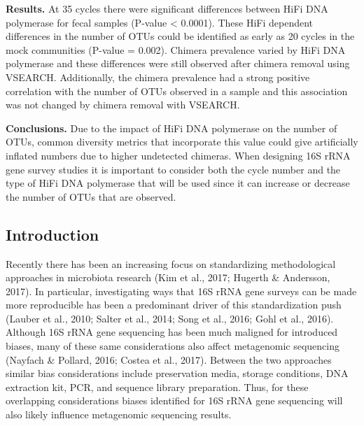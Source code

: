 \documentclass[12pt,]{article}
\begin{document}
\textbf{Results.} At 35 cycles there were significant differences
between HiFi DNA polymerase for fecal samples (P-value \textless{}
0.0001). These HiFi dependent differences in the number of OTUs could be
identified as early as 20 cycles in the mock communities (P-value =
0.002). Chimera prevalence varied by HiFi DNA polymerase and these
differences were still observed after chimera removal using VSEARCH.
Additionally, the chimera prevalence had a strong positive correlation
with the number of OTUs observed in a sample and this association was
not changed by chimera removal with VSEARCH.

\textbf{Conclusions.} Due to the impact of HiFi DNA polymerase on the
number of OTUs, common diversity metrics that incorporate this value
could give artificially inflated numbers due to higher undetected
chimeras. When designing 16S rRNA gene survey studies it is important to
consider both the cycle number and the type of HiFi DNA polymerase that
will be used since it can increase or decrease the number of OTUs that
are observed.

\newpage

\subsection{Introduction}\label{introduction}

Recently there has been an increasing focus on standardizing
methodological approaches in microbiota research (Kim et al., 2017;
Hugerth \& Andersson, 2017). In particular, investigating ways that 16S
rRNA gene surveys can be made more reproducible has been a predominant
driver of this standardization push (Lauber et al., 2010; Salter et al.,
2014; Song et al., 2016; Gohl et al., 2016). Although 16S rRNA gene
sequencing has been much maligned for introduced biases, many of these
same considerations also affect metagenomic sequencing (Nayfach \&
Pollard, 2016; Costea et al., 2017). Between the two approaches similar
bias considerations include preservation media, storage conditions, DNA
extraction kit, PCR, and sequence library preparation. Thus, for these
overlapping considerations biases identified for 16S rRNA gene
sequencing will also likely influence metagenomic sequencing results.
\end{document}
